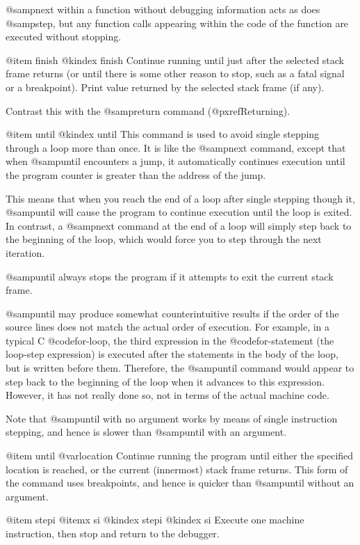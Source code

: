 @samp{next} within a function without debugging information acts as does
@samp{step}, but any function calls appearing within the code of the
function are executed without stopping.

@item finish
@kindex finish
Continue running until just after the selected stack frame returns (or
until there is some other reason to stop, such as a fatal signal or a
breakpoint).  Print value returned by the selected stack frame (if any).

Contrast this with the @samp{return} command (@pxref{Returning}).

@item until
@kindex until
This command is used to avoid single stepping through a loop more than
once.  It is like the @samp{next} command, except that when @samp{until}
encounters a jump, it automatically continues execution until the
program counter is greater than the address of the jump.

This means that when you reach the end of a loop after single stepping
though it, @samp{until} will cause the program to continue execution
until the loop is exited.  In contrast, a @samp{next} command at the end
of a loop will simply step back to the beginning of the loop, which
would force you to step through the next iteration.

@samp{until} always stops the program if it attempts to exit the current
stack frame.

@samp{until} may produce somewhat counterintuitive results if the order
of the source lines does not match the actual order of execution.  For
example, in a typical C @code{for}-loop, the third expression in the
@code{for}-statement (the loop-step expression) is executed after the
statements in the body of the loop, but is written before them.
Therefore, the @samp{until} command would appear to step back to the
beginning of the loop when it advances to this expression.  However, it
has not really done so, not in terms of the actual machine code.

Note that @samp{until} with no argument works by means of single
instruction stepping, and hence is slower than @samp{until} with an
argument.

@item until @var{location}
Continue running the program until either the specified location is
reached, or the current (innermost) stack frame returns.  This form of
the command uses breakpoints, and hence is quicker than @samp{until}
without an argument.

@item stepi
@itemx si
@kindex stepi
@kindex si
Execute one machine instruction, then stop and return to the debugger.

